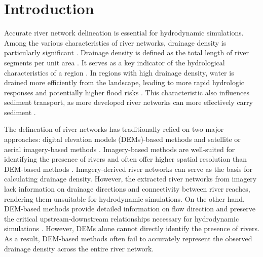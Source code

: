 \documentclass[water,article,submit,pdftex,moreauthors]{Definitions/mdpi}
\begin{document}
\section{Introduction}
\label{sec:intro}

Accurate river network delineation is essential for hydrodynamic simulations. Among the various characteristics of river networks, drainage density is particularly significant \citep{mutzner2013WRR}. Drainage density is defined as the total length of river segments per unit area \citep{horton1932ETAGU, horton1945GSAB}. It serves as a key indicator of the hydrological characteristics of a region \citep{tarboton1992G}. In regions with high drainage density, water is drained more efficiently from the landscape, leading to more rapid hydrologic responses and potentially higher flood risks \citep{singh2021WRR, pallard2009HESS}. This characteristic also influences sediment transport, as more developed river networks can more effectively carry sediment \citep{tarboton1992G}.

The delineation of river networks has traditionally relied on two major approaches: digital elevation models (DEMs)-based methods \citep{tarboton1991HP, lin2021SD, yamazaki2019WRR, amatulli2022ESSD, munier2022ESSD} and satellite or aerial imagery-based methods \citep{wang2021RSE}. Imagery-based methods are well-suited for identifying the presence of rivers and often offer higher spatial resolution than DEM-based methods \citep{wang2021RSE}. Imagery-derived river networks can serve as the basis for calculating drainage density. However, the extracted river networks from imagery lack information on drainage directions and connectivity between river reaches, rendering them unsuitable for hydrodynamic simulations. On the other hand, DEM-based methods provide detailed information on flow direction and preserve the critical upstream-downstream relationships necessary for hydrodynamic simulations \citep{tarboton1991HP, lin2021SD, yamazaki2019WRR}. However, DEMs alone cannot directly identify the presence of rivers. As a result, DEM-based methods often fail to accurately represent the observed drainage density across the entire river network.
\end{document}
